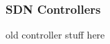 \renewcommand{\imgpath}{legacy/old-netprog/img}

\subsubsection{SDN Controllers}
old controller stuff here
